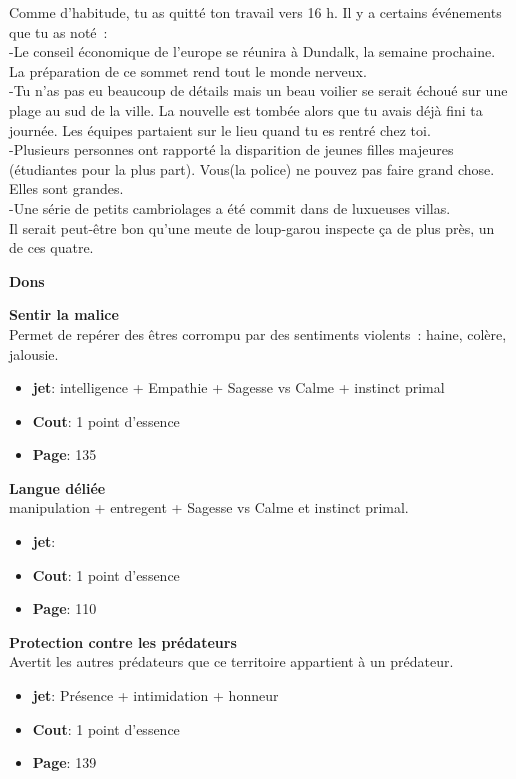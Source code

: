 \documentclass[oneside,12pt]{book}
\newcommand\don[5]{
\textbf{#1} \\
#2
\begin{itemize}
\item{ \textbf{jet}: #3}
\item{ \textbf{Cout}: #4}
\item{ \textbf{Page}: #5}
\end{itemize}
\vspace{0.5cm}
}
\begin{document}
\begin{flushleft}
\begin{description}
{Comme d'habitude, tu as quitté ton travail vers 16 h. Il y a certains événements que tu as noté : \\
-Le conseil économique de l'europe se réunira à Dundalk, la semaine prochaine.  La préparation de ce sommet rend tout le monde nerveux. \\
-Tu n'as pas eu beaucoup de détails mais un beau voilier se serait échoué sur une plage au sud de la ville. La nouvelle est tombée alors que tu avais déjà fini ta journée. Les équipes partaient sur le lieu quand tu es rentré chez toi.\\
-Plusieurs personnes ont rapporté la disparition de jeunes filles majeures (étudiantes pour la plus part). Vous(la police) ne pouvez pas faire grand chose. Elles sont grandes. \\
-Une série de petits cambriolages a été commit dans de luxueuses villas. \\
Il serait peut-être bon qu'une meute de loup-garou inspecte ça de plus près, un de ces quatre.\\
}
\end{description}
\clearpage
\textbf{\large Dons} 
\vspace{0.5cm}

\don{Sentir la malice}{Permet de repérer des êtres corrompu par des sentiments violents : haine, colère, jalousie.}{intelligence + Empathie + Sagesse vs Calme + instinct primal}{1 point d'essence}{135}
\don{Langue déliée}{ manipulation + entregent + Sagesse vs Calme et instinct primal.}{}{1 point d'essence}{110}
\don{Protection contre les prédateurs}{Avertit les autres prédateurs que ce territoire appartient à un prédateur.}{Présence + intimidation + honneur}{1 point d'essence}{139}

\clearpage

\end{flushleft}
\end{document}
